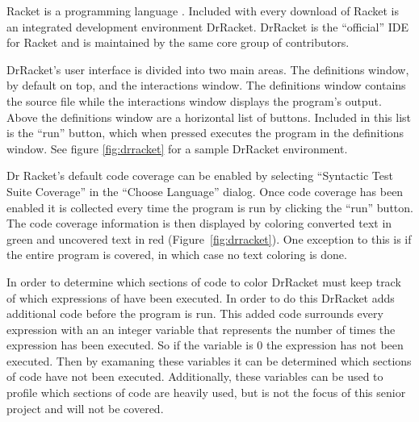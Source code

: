 Racket is a programming language \cite{racket}. Included with every download of Racket is an integrated development environment DrRacket. DrRacket is the ``official'' IDE for Racket and is maintained by the same core group of contributors. 

DrRacket's user interface is divided into two main areas. The definitions window, by default on top, and the interactions window. The definitions window contains the source file while the interactions window displays the program's output. Above the definitions window are a horizontal list of buttons. Included in this list is the ``run'' button, which when pressed executes the program in the definitions window. See figure \ref{fig:drracket} for a sample DrRacket environment.

Dr Racket's default code coverage can be enabled by selecting ``Syntactic Test Suite Coverage'' in the ``Choose Language'' dialog. Once code coverage has been enabled it is collected every time the program is run by clicking the ``run'' button. 
The code coverage information is then displayed by coloring converted text in green and uncovered text in red (Figure~\ref{fig:drracket}). One exception to this is if the entire program is covered, in which case no text coloring is done.


In order to determine which sections of code to color DrRacket must keep track of which expressions of have been executed. In order to do this DrRacket adds additional code before the program is run. This added code surrounds every expression with an an integer variable that represents the number of times the expression has been executed. So if the variable is 0 the expression has not been executed. Then by examaning these variables it can be determined which sections of code have not been executed. Additionally, these variables can be used to profile which sections of code are heavily used, but is not the focus of this senior project and will not be covered.

